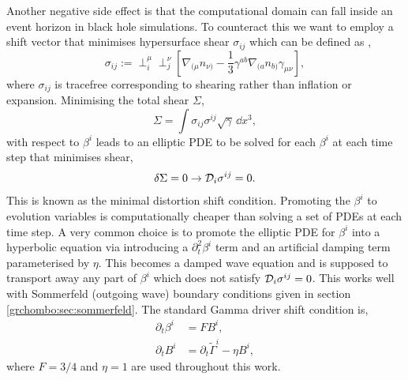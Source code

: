  Another negative side effect is that the computational domain can fall inside an event horizon in black hole simulations. To counteract this we want to employ a shift vector that minimises hypersurface shear $\sigma_{ij}$ which can be defined as \cite{smarr1978kinematical},
\begin{equation} \sigma_{ij}:= \perp^\mu_i \perp^\nu_j \left[\nabla_{(\mu} n_{\nu)}-\frac{1}{3}\gamma^{ab}\nabla_{(a} n_{b)} \gamma_{\mu\nu}\right], \end{equation}
where $\sigma_{ij}$ is tracefree corresponding to shearing rather than inflation or expansion. Minimising the total shear $\Sigma$,
\begin{equation} \Sigma = \int \sigma_{ij}\sigma^{ij}\sqrt{\gamma}\,\dd x^3,\end{equation}
with respect to $\beta^i$ leads to an elliptic PDE to be solved for each $\beta^i$ at each time step that minimises shear,
\begin{equation} \delta \Sigma = 0 \rightarrow \mathcal{D}_i\sigma^{ij}=0.\end{equation}
This is known as the minimal distortion shift condition. Promoting the $\beta^i$ to evolution variables is computationally cheaper than solving a set of PDEs at each time step. A very common choice is to promote the elliptic PDE for $\beta^i$ into a hyperbolic equation via introducing a $\partial_t^2\beta^i$ term and an artificial damping term parameterised by $\eta$. This becomes a damped wave equation and is supposed to transport away any part of $\beta^i$ which does not satisfy $\mathcal{D}_i \sigma^{ij}=0$. This works well with Sommerfeld (outgoing wave) boundary conditions given in section \ref{grchombo:sec:sommerfeld}. The standard Gamma driver shift condition is,
\begin{align}
\partial_t \beta^i &= FB^i,\label{nr:eq:gammadriver1}\\
 \partial_t B^i &= \partial_t \tilde{\Gamma}^i - \eta B^i,\label{nr:eq:gammadriver2}\end{align}
where $F=3/4$ and $\eta=1$ are used throughout this work.

